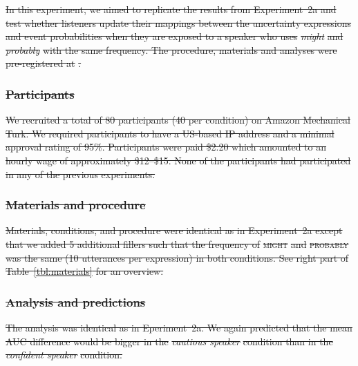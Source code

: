 \documentclass[man, floatsintext]{apa6}
\newcommand{\tableref}[1]{Table~\ref{#1}}
\providecommand{\DIFdel}[1]{{\protect\color{red}\sout{#1}}}                      %
\begin{document}
\DIFdel{In this experiment, we aimed to replicate the results from Experiment~2a and test whether listeners update their 
mappings between the uncertainty expressions and event probabilities when they are exposed to a speaker who
uses }\textit{\DIFdel{might}} %
\DIFdel{and }\textit{\DIFdel{probably}} %
\DIFdel{with the same frequency.  The procedure, materials and analyses were pre-registered at }%
\DIFdel{.
}\subsubsection{\DIFdel{Participants}}
\addtocounter{subsubsection}{-1}%
\DIFdel{We recruited a total of 80 participants (40 per condition) on Amazon Mechanical Turk. 
We required participants to have a US-based IP address and a minimal approval rating 
of 95\%. Participants were paid \$2.20 which amounted to an hourly wage of approximately 
\$12--\$15. None of the participants had participated in any of the previous experiments.
}%

\subsubsection{\DIFdel{Materials and procedure}}
\addtocounter{subsubsection}{-1}%

\DIFdel{Materials, conditions, and procedure were identical as in Experiment~2a except that we added 5 additional fillers such
that the frequency of }\textsc{\DIFdel{might}} %
\DIFdel{and }\textsc{\DIFdel{probably}} %
\DIFdel{was the same (10 utterances per expression) in both conditions. 
See right part of \tableref{tbl:materials} for an overview.
}%

\subsubsection{\DIFdel{Analysis and predictions}}  
\addtocounter{subsubsection}{-1}%

\DIFdel{The analysis was identical as in Eperiment~2a. We again predicted that the mean AUC difference would be bigger in the 
}\emph{\DIFdel{cautious speaker}} %
\DIFdel{condition than in the }\emph{\DIFdel{confident speaker}} %
\DIFdel{condition.
}%
\end{document}
